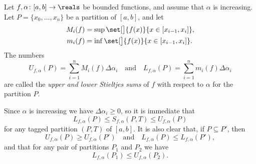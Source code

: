 \documentclass[article, a4paper, 11pt, oneside]{memoir}
\numberwithin{equation}{chapter}
\begin{document}
\begin{definition}
    Let $f, \alpha \colon [a,b] \to \reals$ be bounded functions, and assume that $\alpha$ is increasing. Let $P = \{x_0, \ldots, x_n\}$ be a partition of $[a,b]$, and let
    \begin{align*}
        M_i(f)
            &= \sup \set[\big]{f(x)}{x \in [x_{i-1}, x_i]}, \\
        m_i(f)
            &= \inf \set[\big]{f(x)}{x \in [x_{i-1}, x_i]}.
    \end{align*}
    The numbers
    \begin{equation*}
        U_{f,\alpha}(P)
            = \sum_{i=1}^n M_i(f) \Delta \alpha_i
        \quad \text{and} \quad
        L_{f,\alpha}(P)
            = \sum_{i=1}^n m_i(f) \Delta \alpha_i
    \end{equation*}
    are called the \emph{upper and lower Stieltjes sums} of $f$ with respect to $\alpha$ for the partition $P$.
\end{definition}
%
Since $\alpha$ is increasing we have $\Delta\alpha_i \geq 0$, so it is immediate that
%
\begin{equation*}
    L_{f,\alpha}(P)
        \leq S_{f,\alpha}(P,T)
        \leq U_{f,\alpha}(P)
\end{equation*}
%
for any tagged partition $(P,T)$ of $[a,b]$. It is also clear that, if $P \subseteq P'$, then
%
\begin{equation}
    \label{eq:upper-lower-sum-decreasing-increasing}
    U_{f,\alpha}(P) \geq U_{f,\alpha}(P')
    \quad \text{and} \quad
    L_{f,\alpha}(P) \leq L_{f,\alpha}(P'),
\end{equation}
%
and that for any pair of partitions $P_1$ and $P_2$ we have
%
\begin{equation}
    \label{eq:upper-lower-sum-inequality}
    L_{f,\alpha}(P_1) \leq U_{f,\alpha}(P_2).
\end{equation}


\def\upint{\mathchoice%
    {\mkern10mu\overline{\vphantom{\intop}\mkern10mu}\mkern-20mu}%
    {\mkern7mu\overline{\vphantom{\intop}\mkern7mu}\mkern-14mu}%
    {\mkern7mu\overline{\vphantom{\intop}\mkern7mu}\mkern-14mu}%
    {\mkern7mu\overline{\vphantom{\intop}\mkern7mu}\mkern-14mu}%
  \int}
\def\lowint{\mkern2mu\underline{\vphantom{\intop}\mkern10mu}\mkern-12mu\int}
\end{document}
